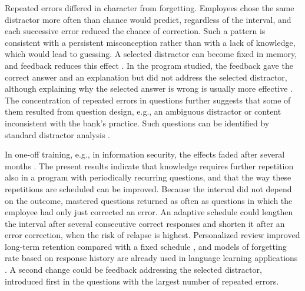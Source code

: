 Repeated errors differed in character from forgetting. Employees chose the same distractor more often
than chance would predict, regardless of the interval, and each successive error reduced the chance of
correction. Such a pattern is consistent with a persistent misconception rather than with a lack of
knowledge, which would lead to guessing. A selected distractor can become fixed in memory, and feedback
reduces this effect \citep{butler2008}. In the program studied, the feedback gave the correct answer
and an explanation but did not address the selected distractor, although explaining why the selected
answer is wrong is usually more effective \citep{shute2008}. The concentration of repeated errors in
\PersistTopItems{} questions further suggests that some of them resulted from question design, e.g.,
an ambiguous distractor or content inconsistent with the bank's practice. Such questions can be
identified by standard distractor analysis \citep{gierl2017}.

In one-off training, e.g., in information security, the effects faded after several months
\citep{reinheimer2020}. The present results indicate that knowledge requires further repetition also in
a program with periodically recurring questions, and that the way these repetitions are scheduled can
be improved. Because the interval did not depend on the outcome, mastered questions returned as often
as questions in which the employee had only just corrected an error. An adaptive schedule could
lengthen the interval after several consecutive correct responses and shorten it after an error
correction, when the risk of relapse is highest. Personalized review improved long-term retention
compared with a fixed schedule \citep{lindsey2014}, and models of forgetting rate based on response
history are already used in language learning applications \citep{settles2016}. A second change could
be feedback addressing the selected distractor, introduced first in the questions with the largest
number of repeated errors.

